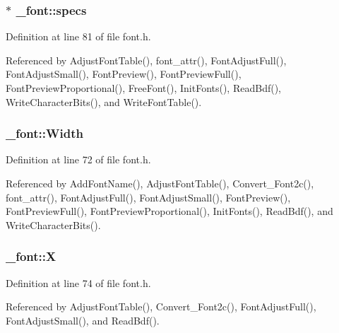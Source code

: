 \hypertarget{struct__font_a76b5b07cf75a869627eca27d7a32836a}{
\subsubsection[{specs}]{ $\ast$ \-\_\-font\-::specs}}\label{struct__font_a76b5b07cf75a869627eca27d7a32836a}


Definition at line 81 of file font.\-h.



Referenced by Adjust\-Font\-Table(), font\-\_\-attr(), Font\-Adjust\-Full(), Font\-Adjust\-Small(), Font\-Preview(), Font\-Preview\-Full(), Font\-Preview\-Proportional(), Free\-Font(), Init\-Fonts(), Read\-Bdf(), Write\-Character\-Bits(), and Write\-Font\-Table().

\hypertarget{struct__font_ae3d3b48670f1bf4bf6dbf42794f81b31}{
\subsubsection[{Width}]{ \-\_\-font\-::\-Width}}\label{struct__font_ae3d3b48670f1bf4bf6dbf42794f81b31}


Definition at line 72 of file font.\-h.



Referenced by Add\-Font\-Name(), Adjust\-Font\-Table(), Convert\-\_\-\-Font2c(), font\-\_\-attr(), Font\-Adjust\-Full(), Font\-Adjust\-Small(), Font\-Preview(), Font\-Preview\-Full(), Font\-Preview\-Proportional(), Init\-Fonts(), Read\-Bdf(), and Write\-Character\-Bits().

\hypertarget{struct__font_a64a08fdbdaa19418a9b7a34a2db33150}{
\subsubsection[{X}]{ \-\_\-font\-::\-X}}\label{struct__font_a64a08fdbdaa19418a9b7a34a2db33150}


Definition at line 74 of file font.\-h.



Referenced by Adjust\-Font\-Table(), Convert\-\_\-\-Font2c(), Font\-Adjust\-Full(), Font\-Adjust\-Small(), and Read\-Bdf().

